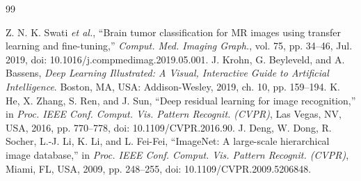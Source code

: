 \documentclass[letterpaper, 10 pt, conference]{ieeeconf}  %
\begin{document}

\begin{thebibliography}{99}

 Z. N. K. Swati \textit{et al.}, ``Brain tumor classification for MR images using transfer learning and fine-tuning,'' \textit{Comput. Med. Imaging Graph.}, vol. 75, pp. 34--46, Jul. 2019, doi: 10.1016/j.compmedimag.2019.05.001.
 J. Krohn, G. Beyleveld, and A. Bassens, \textit{Deep Learning Illustrated: A Visual, Interactive Guide to Artificial Intelligence}. Boston, MA, USA: Addison-Wesley, 2019, ch. 10, pp. 159--194.
 K. He, X. Zhang, S. Ren, and J. Sun, ``Deep residual learning for image recognition,'' in \textit{Proc. IEEE Conf. Comput. Vis. Pattern Recognit. (CVPR)}, Las Vegas, NV, USA, 2016, pp. 770--778, doi: 10.1109/CVPR.2016.90.
 J. Deng, W. Dong, R. Socher, L.-J. Li, K. Li, and L. Fei-Fei, ``ImageNet: A large-scale hierarchical image database,'' in \textit{Proc. IEEE Conf. Comput. Vis. Pattern Recognit. (CVPR)}, Miami, FL, USA, 2009, pp. 248--255, doi: 10.1109/CVPR.2009.5206848.

\end{thebibliography}
\end{document}
